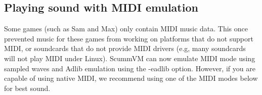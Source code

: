 

\subsection{Playing sound with MIDI emulation}

Some games (such as Sam and Max) only contain MIDI music data.  This once
prevented music for these games from working on platforms that do not support
MIDI, or soundcards that do not provide MIDI drivers (e.g, many soundcards will
not play MIDI under Linux). ScummVM can now emulate MIDI mode using sampled
waves and Adlib emulation using the -eadlib option.  However, if you are capable
of using native MIDI, we recommend using one of the MIDI modes below for best
sound.
